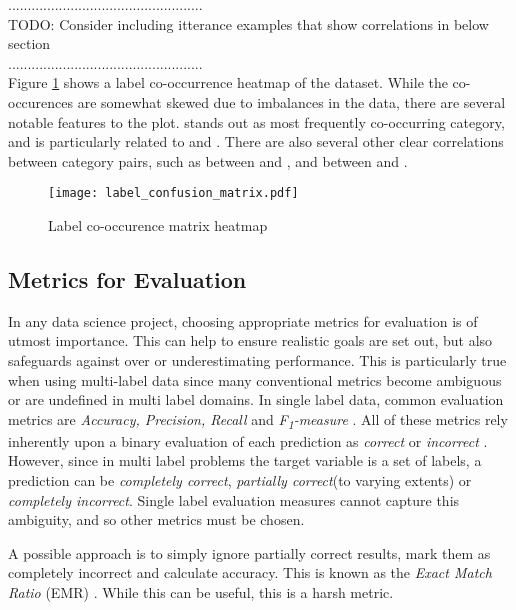 \documentclass[Dissertation.tex]{subfiles}
\begin{document}
..................................................\\
TODO: Consider including itterance examples that show correlations in below section\\
..................................................\\


Figure \ref{fig:labCoOc} shows a label co-occurrence heatmap of the dataset. While the co-occurences are somewhat skewed due to imbalances in the data, there are several notable features to the plot.  stands out as most frequently co-occurring category,  and is particularly related to  and .	 There are also several other clear correlations between category pairs, such as between  and , and between  and .


\begin{figure}
	\centering
	\hspace*{1em}
	\texttt{[image: label\_confusion\_matrix.pdf]}
	\caption{Label co-occurence matrix heatmap}
	\label{fig:labCoOc}
\end{figure}




\subsection{Metrics for Evaluation}
In any data science project, choosing appropriate metrics for evaluation is of utmost importance. This can help to ensure realistic goals are set out, but also  safeguards against over or underestimating performance. This is particularly true when using multi-label data since many conventional metrics become ambiguous or are undefined in multi label domains. In single label data, common evaluation metrics are \textit{Accuracy, Precision, Recall} and \textit{F\textsubscript{1}-measure} \cite{sorowerLiteratureSurveyAlgorithms2018}. All of these metrics rely inherently upon a binary evaluation of each prediction as \textit{correct} or \textit{incorrect} \cite{sorowerLiteratureSurveyAlgorithms2018}. However, since in multi label problems the target variable is a set of labels, a prediction can be \textit{completely correct}, \textit{partially correct}(to varying extents) or \textit{completely incorrect}. Single label evaluation measures cannot capture this ambiguity, and so other metrics must be chosen.

A possible approach is to simply ignore partially correct results, mark them as completely incorrect and calculate accuracy. This is known as the \textit{Exact Match Ratio} (EMR) \cite{sorowerLiteratureSurveyAlgorithms2018}. While this can be useful, this is a harsh metric.
\end{document}
